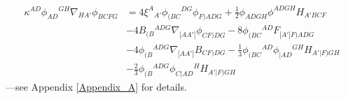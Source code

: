 \documentclass[10pt,a4paper]{article}
\theoremstyle{plain}
\begin{document}
\begin{align}
    \kappa^{AD} \phi_{AD}{}^{GH} \nabla_{HA'}\phi_{BCFG} &= 4
    \xi^{A}{}_{A'}\phi_{(BC}{}^{DG}\phi_{F)ADG} + \tfrac{1}{2}
    \phi_{ADGH} \phi^{ADGH} H_{A'BCF} \nonumber\\ & - 4
    B_{(B}{}^{ADG}\nabla_{|AA'|}\phi_{CF)DG} - 8
    \phi_{(BC}{}^{AD}F_{|A'|F)ADG}\nonumber \\ & - 4
    \phi_{(B}{}^{ADG}\nabla_{|AA'|}B_{CF)DG} - \tfrac{1}{3}
    \phi_{(BC}{}^{AD}\phi_{|AD}{}^{GH}H_{A'|F)GH}\nonumber \\ & -
    \tfrac{2}{3}
    \phi_{(B}{}^{ADG}\phi_{C|AD}{}^{H}H_{A'|F)GH} \label{Eq:MiscIdentity3}
\end{align}
---see Appendix \ref{Appendix_A} for details.
\\
\end{document}
